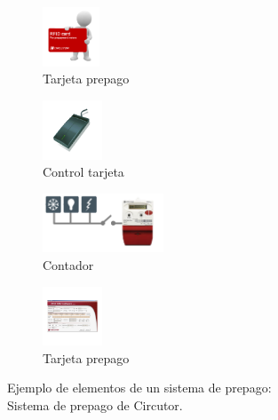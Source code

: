 \begin{figure}[ht!]
\begin{figurebox}
    \begin{subfigure}{.2\textwidth}
  \centering
   \includegraphics[height=50pt]{tarjeta.png}
   \caption{Tarjeta prepago}
\end{subfigure}
 \begin{subfigure}{.2\textwidth}
  \centering
   \includegraphics[height=50pt]{control.png}
   \caption{Control tarjeta}
\end{subfigure}
\begin{subfigure}{.2\textwidth}
\centering
  \includegraphics[height=50pt]{ContadorMonofasico.png}
  \caption{Contador}
 \end{subfigure}
 \begin{subfigure}{.2\textwidth}
  \centering
   \includegraphics[height=50pt]{software.png}
   \caption{Tarjeta prepago}
\end{subfigure} \caption{Ejemplo de elementos de un sistema de prepago:\\ Sistema de prepago de Circutor.} \label{figure:elementos}
\end{figurebox}
\end{figure}

